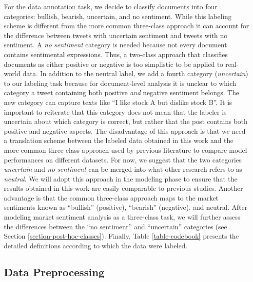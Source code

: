 For the data annotation task, we decide to classify documents into four categories: bullish, bearish, uncertain, and no sentiment. While this labeling scheme is different from the more common three-class approach it can account for the difference between tweets with uncertain sentiment and tweets with no sentiment. A \emph{no sentiment} category is needed because not every document contains sentimental expressions. Thus, a two-class approach that classifies documents as either positive or negative is too simplistic to be applied to real-world data. In addition to the neutral label, we add a fourth category (\emph{uncertain}) to our labeling task because for document-level analysis it is unclear to which category a tweet containing both positive \emph{and} negative sentiment belongs. The new category can capture texts like ``I like stock A but dislike stock B''. It is important to reiterate that this category does not mean that the labeler is uncertain about which category is correct, but rather that the post contains both positive and negative aspects.
 The disadvantage of this approach is that we need a translation scheme between the labeled data obtained in this work and the more common three-class approach used by previous literature to compare model performances on different datasets. For now, we suggest that the two categories \emph{uncertain} and \emph{no sentiment} can be merged into what other research refers to as \emph{neutral}. We will adopt this approach in the modeling phase to ensure that the results obtained in this work are easily comparable to previous studies. Another advantage is that the common three-class approach maps to the market sentiments known as ``bullish'' (positive), ``bearish'' (negative), and neutral. After modeling market sentiment analysis as a three-class task, we will further assess the differences between the ``no sentiment'' and ``uncertain'' categories (see Section \ref{section-post-hoc-classes}).
 Finally, Table \ref{table-codebook} presents the detailed definitions according to which the data were labeled.
 



\subsection{Data Preprocessing}
\label{section-data-preprocessing}
